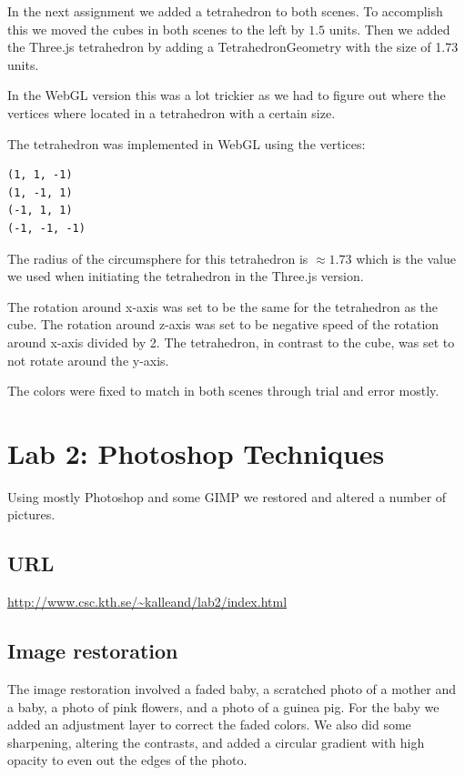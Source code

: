 \documentclass[a4paper]{article}
\begin{document}
In the next assignment we added a tetrahedron to both scenes. To accomplish this
we moved the cubes in both scenes to the left by $1.5$ units. Then we added the
Three.js tetrahedron by adding a TetrahedronGeometry with the size of 1.73 units.

In the WebGL version this was a lot trickier as we had to figure out where the
vertices where located in a tetrahedron with a certain size.

The tetrahedron was implemented in WebGL using the vertices:

\begin{verbatim}
(1, 1, -1)
(1, -1, 1)
(-1, 1, 1)
(-1, -1, -1)
\end{verbatim}

The radius of the circumsphere for this tetrahedron is $\approx 1.73$ which is
the value we used when initiating the tetrahedron in the Three.js version.

The rotation around x-axis was set to be the same for the tetrahedron as the
cube. The rotation around z-axis was set to be negative speed of the rotation
around x-axis divided by 2. The tetrahedron, in contrast to the cube, was set to
not rotate around the y-axis.

The colors were fixed to match in both scenes through trial and error mostly.

\newpage

\section{Lab 2: Photoshop Techniques}

Using mostly Photoshop and some GIMP we restored and altered a number of pictures.

\subsection*{URL}

\url{http://www.csc.kth.se/~kalleand/lab2/index.html}

\subsection{Image restoration} %

The image restoration involved a faded baby, a scratched photo of a mother and a
baby, a photo of pink flowers, and a photo of a guinea pig. For the baby we
added an adjustment layer to correct the faded colors. We also did some
sharpening, altering the contrasts, and added a circular gradient with high
opacity to even out the edges of the photo.
\end{document}
